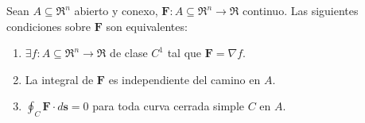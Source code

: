 \begin{theorem}
    Sean $A\subseteq\Re^n$ abierto y conexo, $\mathbf{F}:A\subseteq\Re^n\to\Re$ continuo. Las siguientes condiciones sobre $\mathbf{F}$ son equivalentes:
    \begin{enumerate}
        \item $\exists f:A\subseteq\Re^n\to\Re$ de clase $C^1$ tal que $\mathbf{F}=\nabla f.$ 
        \item La integral de $\mathbf{F}$ es independiente del camino en $A$.
        \item $\oint_C\mathbf{F}\cdot d\mathbf{s}=0$ para toda curva cerrada simple $C$ en $A$.
    \end{enumerate}
\end{theorem}